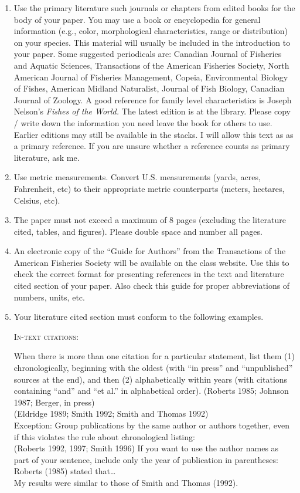 \documentclass[11pt]{article}
\newcommand{\VSpace}{\vspace{\baselineskip}}
\begin{document}
\begin{enumerate}
	\item Use the primary literature such journals or chapters from edited books for the body of your paper. You may use a book or encyclopedia for general information (e.g., color, morphological characteristics, range or distribution) on your species. This material will usually be included in the introduction to your paper. Some suggested periodicals are: Canadian Journal of Fisheries and Aquatic Sciences, Transactions of the American Fisheries Society, North American Journal of Fisheries Management, Copeia, Environmental Biology of Fishes, American Midland Naturalist, Journal of Fish Biology, Canadian Journal of Zoology.  A good reference for family level characteristics is Joseph Nelson’s \textit{Fishes of the World.}  The latest edition is at the library. Please copy / write down the information you need leave the book for others to use.   Earlier editions may still be available in the stacks. I will allow this text as as a primary reference.  If you are unsure whether a reference counts as primary literature, ask me.

	\item Use metric measurements.  Convert U.S. measurements (yards, acres, Fahrenheit, etc) to their appropriate metric counterparts (meters, hectares, Celsius, etc).

	\item The paper must not exceed a maximum of 8 pages (excluding the literature cited, tables, and figures). Please double space and number all pages.
	
	\item An electronic copy of the “Guide for Authors” from the Transactions of the American Fisheries Society will be available on the class website. Use this to check the correct format for presenting references in the text and literature cited section of your paper. Also check this guide for proper abbreviations of numbers, units, etc.
	
	\item Your literature cited section must conform to the following examples.
	
	\VSpace
	\textsc{In-text citations:}
	
	When there is more than one citation for a particular statement, list them (1) chronologically, beginning with the oldest (with “in press” and “unpublished” sources at the end), and then (2) alphabetically within years (with citations containing “and” and “et al.” in alphabetical order).
	\VSpace
	(Roberts 1985; Johnson 1987; Berger, in press)\\
	(Eldridge 1989; Smith 1992; Smith and Thomas 1992)\\
	Exception: Group publications by the same author or authors together, even if this violates the rule about chronological listing:\\
	(Roberts 1992, 1997; Smith 1996)
	\VSpace
	If you want to use the author names as part of your sentence, include only the year of publication in parentheses:
	\VSpace
	Roberts (1985) stated that\dots \\
	My results were similar to those of Smith and Thomas (1992).


\end{enumerate}
\end{document}
